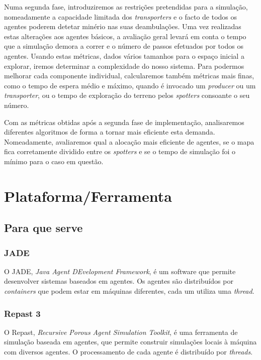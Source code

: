 \documentclass[12pt]{report}
\begin{document}
Numa segunda fase, introduziremos as restrições pretendidas para a simulação, nomeadamente a capacidade limitada dos \emph{transporters} e o facto de todos os agentes poderem detetar minério nas suas deambulações. Uma vez realizadas estas alterações aos agentes básicos, a avaliação geral levará em conta o tempo que a simulação demora a correr e o número de passos efetuados por todos os agentes. Usando estas métricas, dados vários tamanhos para o espaço inicial a explorar, iremos determinar a complexidade do nosso sistema. Para podermos melhorar cada componente individual, calcularemos também métricas mais finas, como o tempo de espera médio e máximo, quando é invocado um \emph{producer} ou um \emph{transporter}, ou o tempo de exploração do terreno pelos \emph{spotters} consoante o seu número.

Com as métricas obtidas após a segunda fase de implementação, analisaremos diferentes algoritmos de forma a tornar mais eficiente esta demanda. Nomeadamente, avaliaremos qual a alocação mais eficiente de agentes, se o mapa fica corretamente dividido entre os \emph{spotters} e se o tempo de simulação foi o mínimo para o caso em questão.


\chapter{Plataforma/Ferramenta}

\section{Para que serve}

  \subsection{JADE}
  O JADE, \emph{Java Agent DEvelopment Framework}, é um software que permite desenvolver sistemas baseados em agentes. Os agentes são distribuídos por \emph{containers} que podem estar em máquinas diferentes, cada um utiliza uma \emph{thread}. 

  \subsection{Repast 3}
  O Repast, \emph{Recursive Porous Agent Simulation Toolkit}, é uma ferramenta de simulação baseada em agentes, que permite construir simulações locais à máquina com diversos agentes. O processamento de cada agente é distribuído por \emph{threads}.
\end{document}

